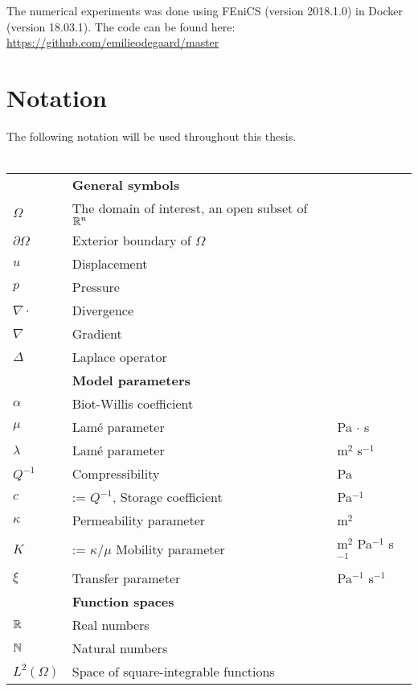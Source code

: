 \\
\\
The numerical experiments was done using FEniCS \cite{fenics} (version 2018.1.0) in Docker \cite{docker} (version 18.03.1). The code can be found here: \url{https://github.com/emilieodegaard/master}

\newpage
\section{Notation}
The following notation will be used throughout this thesis.
\\
\\
\begin{tabular}{lll}
                  & \textbf{General symbols} & \\[3pt]
    $\Omega $   & The domain of interest, an open subset of $\mathbb{R}^n$ &\\ [3pt]
    $\partial\Omega$   & Exterior boundary of $\Omega$ &\\[3pt]
    $u$  & Displacement &\\[3pt]
    $p$  & Pressure &\\[3pt]
    $\nabla \cdot $  & Divergence  & \\[3pt]
    $\nabla $ & Gradient  & \\[3pt]
    $\Delta$  & Laplace operator &\\[3pt]
                 & \textbf{Model parameters} & \\[3pt]
    $\alpha$  & Biot-Willis coefficient &  \\[3pt]
    $\mu$      & Lamé parameter & Pa $\cdot$ s  \\[3pt]
    $\lambda$  & Lamé parameter & m$^2$ s$^{-1}$  \\[3pt]
    $Q^{-1}$    & Compressibility  & Pa \\[3pt]
    $c$    & := $Q^{-1}$, Storage coefficient & Pa$^{-1}$\\[3pt]
 	$\kappa$   & Permeability parameter  & m$^{2}$\\[3pt]
    $K$   & := $\kappa / \mu$ Mobility parameter  & m$^{2}$ Pa$^{-1}$ s$^{-1}$\\[3pt]
    $\xi$     & Transfer parameter  & Pa$^{-1}$ s$^{-1}$\\[3pt]
                  & \textbf{Function spaces} & \\[3pt]
    $\mathbb{R}$ & Real numbers &  \\[3pt]
    $\mathbb{N}$ & Natural numbers & \\[3pt]
    $L^2(\Omega)$ & Space of square-integrable functions &\\[3pt]

\end{tabular}
